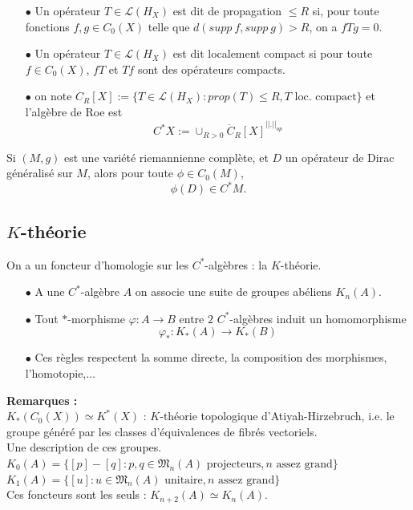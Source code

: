 \documentclass{beamer}
\begin{document}
\begin{frame}
\begin{definition}%
\begin{itemize}
\item[$\bullet$]Un opérateur $T\in \mathcal L(H_X)$ est dit de propagation $\leq R$ si, pour toute fonctions $f,g\in C_0(X)$ telle que $d(supp\ f, supp\ g) >R$, on a $fTg=0$.
\item[$\bullet$] Un opérateur $T\in \mathcal L(H_X)$ est dit localement compact si pour toute $f\in C_0(X)$, $fT$ et $Tf$ sont des opérateurs compacts.
\item[$\bullet$] on note $C_R[X]:=\{T\in \mathcal L(H_X) : prop(T)\leq R, T \text{ loc. compact}\}$ et l'algèbre de Roe est  \[C^*X:=\overline{\cup_{R>0} C_R[X]}^{||.||_{op}}\]
\end{itemize}
\end{definition}
Si $(M,g)$ est une variété riemannienne complète, et $D$ un opérateur de Dirac généralisé sur $M$, alors pour toute $\phi\in C_0(M)$,
\[\phi(D)\in C^*M.\]
\end{frame}

\subsection{$K$-théorie}
\begin{frame}
\tableofcontents[currentsubsection]
\end{frame}

\begin{frame}
On a un foncteur d'homologie sur les $C^*$-algèbres : la $K$-théorie.
\begin{itemize}
\item[$\bullet$] A une $C^*$-algèbre $A$ on associe une suite de groupes abéliens $K_n(A)$.
\item[$\bullet$] Tout $*$-morphisme $\varphi : A\rightarrow B$ entre $2$ $C^*$-algèbres induit un homomorphisme 
\[\varphi_*: K_*(A)\rightarrow K_*(B)\]
\item[$\bullet$] Ces règles respectent la somme directe, la composition des morphismes, l'homotopie,... 
\end{itemize}
\textbf{Remarques :}\\
$K_*(C_0(X))\simeq K^*(X)$ : $K$-théorie topologique d'Atiyah-Hirzebruch, i.e. le groupe généré par les classes d'équivalences de fibrés vectoriels.\\
Une description de ces groupes.
$K_0(A) = \{[p]-[q] : p,q\in \mathfrak M_n(A) \text{ projecteurs} ,n\text{ assez grand}\}$\\
$K_1(A) = \{[u] : u\in \mathfrak M_n(A) \text{ unitaire} ,n\text{ assez grand}\}$\\
Ces foncteurs sont les seuls : $K_{n+2}(A)\simeq K_n(A)$.
\end{frame}
\end{document}
